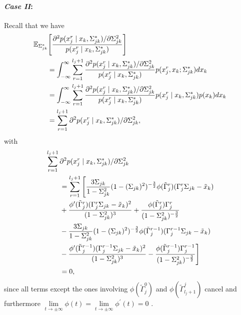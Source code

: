 \begin{condition}
\begin{condition}
        \paragraph{\textit{Case II}:} Recall that we have
        \begin{align*}
            \MoveEqLeft\mathbb{E}_{\Sigma_{jk}^*}\Bigg[\frac{\partial^2 p(x_j^{r} \mid x_{k}, \Sigma_{jk}^*)/\partial \Sigma_{jk}^{2}}{p(x_j^{r} \mid x_{k}, \Sigma_{jk}^*)}\Bigg]                                                  \\
             & = \int_{-\infty}^{\infty} \sum_{r=1}^{l_j+1} \frac{\partial^2 p(x_j^{r} \mid x_{k}, \Sigma_{jk}^*)/\partial \Sigma_{jk}^{2}}{p(x_j^{r} \mid x_{k}, \Sigma_{jk}^*)} p(x_j^{r}, x_{k}; \Sigma_{jk}^*) dx_k             \\
             & = \int_{-\infty}^{\infty} \sum_{r=1}^{l_j+1} \frac{\partial^2 p(x_j^{r} \mid x_{k}, \Sigma_{jk}^*)/\partial \Sigma_{jk}^{2}}{p(x_j^{r} \mid x_{k}, \Sigma_{jk}^*)} p(x_j^{r} \mid x_{k}, \Sigma_{jk}^*)p(x_{k}) dx_k \\
             & = \sum_{r=1}^{l_j+1} \partial^2 p(x_j^{r} \mid x_{k}, \Sigma_{jk}^*)/\partial \Sigma_{jk}^{2},
        \end{align*}
        with
        \begin{align*}
            \MoveEqLeft \sum_{r=1}^{l_j+1} \partial^2 p(x_j^{r} \mid x_{k}, \Sigma_{jk}^*)/\partial \Sigma_{jk}^{2}                                                                                                                 \\
             & =\sum_{r=1}^{l_j+1} \Bigg[ \frac{3\Sigma_{jk}}{1-\Sigma_{jk}^2} (1-(\Sigma_{jk})^2)^{-\frac{3}{2}} \phi({\tilde{\Gamma}}_j^{r})({\Gamma}_j^r\Sigma_{jk} - {\tilde{x}}_{k})                                           \\
             & + \frac{\phi^\prime({\tilde{\Gamma}}_j^{r})({\Gamma}_j^r\Sigma_{jk} - {\tilde{x}}_{k})^2}{(1-\Sigma_{jk}^2)^3} + \frac{\phi({\tilde{\Gamma}}_j^{r}){\Gamma}_j^{r}}{(1-\Sigma_{jk}^2)^{-\frac{3}{2}}}                 \\
             & - \frac{3\Sigma_{jk}}{1-\Sigma_{jk}^2} (1-(\Sigma_{jk})^2)^{-\frac{3}{2}} \phi({\tilde{\Gamma}}_j^{r-1})({\Gamma}_j^{r-1}\Sigma_{jk} - {\tilde{x}}_{k})                                                              \\
             & - \frac{\phi^\prime({\tilde{\Gamma}}_j^{r-1})({\Gamma}_j^{r-1}\Sigma_{jk} - {\tilde{x}}_{k})^2}{(1-\Sigma_{jk}^2)^3} - \frac{\phi({\tilde{\Gamma}}_j^{r-1}){\Gamma}_j^{r-1}}{(1-\Sigma_{jk}^2)^{-\frac{3}{2}}}\Bigg] \\
             & = 0,
        \end{align*}
        since all terms except the ones involving $\phi({\tilde{\Gamma}}_j^{0})$ and $\phi({\tilde{\Gamma}}^j_{l_j+1})$ cancel and furthermore $ \lim\limits_{t \to \pm \infty} \phi(t) = \lim\limits_{t \to \pm \infty} \phi^\prime(t) = 0$ .


\end{condition}
\end{condition}
